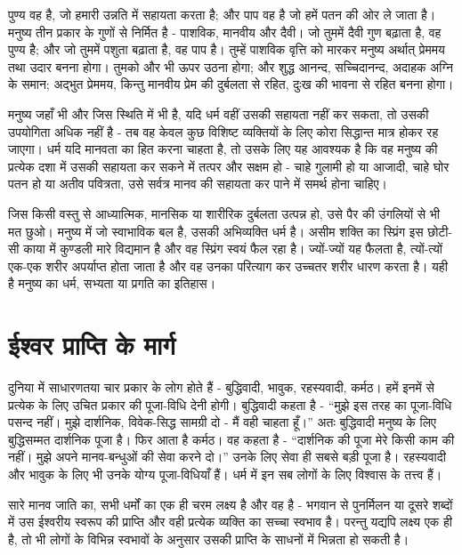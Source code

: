 पुण्य वह है, जो हमारी उन्नति में सहायता करता है; और पाप वह है जो हमें पतन की ओर ले जाता है। मनुष्य तीन प्रकार के गुणों से निर्मित है - पाशविक, मानवीय और दैवी। जो तुममें दैवी गुण बढ़ाता है, वह पुण्य है; और जो तुममें पशुता बढ़ाता है, वह पाप है। तुम्हें पाशविक वृत्ति को मारकर मनुष्य अर्थात् प्रेममय तथा उदार बनना होगा। तुमको और भी ऊपर उठना होगा; और शुद्ध आनन्द, सच्चिदानन्द, अदाहक अग्नि के समान; अद्भुत प्रेममय, किन्तु मानवीय प्रेम की दुर्बलता से रहित, दुःख की भावना से रहित बनना होगा। 

मनुष्य जहाँ भी और जिस स्थिति में भी है, यदि धर्म वहीं उसकी सहायता नहीं कर सकता, तो उसकी उपयोगिता अधिक नहीं है - तब वह केवल कुछ विशिष्ट व्यक्तियों के लिए कोरा सिद्धान्त मात्र होकर रह जाएगा। धर्म यदि मानवता का हित करना चाहता है, तो उसके लिए यह आवश्यक है कि वह मनुष्य की प्रत्येक दशा में उसकी सहायता कर सकने में तत्पर और सक्षम हो - चाहे गुलामी हो या आजादी, चाहे घोर पतन हो या अतीव पवित्रता, उसे सर्वत्र मानव की सहायता कर पाने में समर्थ होना चाहिए। 

जिस किसी वस्तु से आध्यात्मिक, मानसिक या शारीरिक दुर्बलता उत्पन्न हो, उसे पैर की उंगलियों से भी मत छुओ। मनुष्य में जो स्वाभाविक बल है, उसकी अभिव्यक्ति धर्म है। असीम शक्ति का स्प्रिंग इस छोटी-सी काया में कुण्डली मारे विद्यमान है और वह स्प्रिंग स्वयं फैल रहा है। ज्यों-ज्यों यह फैलता है, त्यों-त्यों एक-एक शरीर अपर्याप्त होता जाता है और वह उनका परित्याग कर उच्चतर शरीर धारण करता है। यही है मनुष्य का धर्म, सभ्यता या प्रगति का इतिहास।


\section*{ईश्वर प्राप्ति के मार्ग}


दुनिया में साधारणतया चार प्रकार के लोग होते हैं - बुद्धिवादी, भावुक, रहस्यवादी, कर्मठ। हमें इनमें से प्रत्येक के लिए उचित प्रकार की पूजा-विधि देनी होगी। बुद्धिवादी कहता है - “मुझे इस तरह का पूजा-विधि पसन्द नहीं। मुझे दार्शनिक, विवेक-सिद्ध सामग्री दो - मैं वही चाहता हूँ।” अतः बुद्धिवादी मनुष्य के लिए बुद्धिसम्मत दार्शनिक पूजा है। फिर आता है कर्मठ। वह कहता है - “दार्शनिक की पूजा मेरे किसी काम की नहीं। मुझे अपने मानव-बन्धुओं की सेवा करने दो।” उनके लिए सेवा ही सबसे बड़ी पूजा है। रहस्यवादी और भावुक के लिए भी उनके योग्य पूजा-विधियाँ हैं। धर्म में इन सब लोगों के लिए विश्वास के तत्त्व हैं। 

सारे मानव जाति का, सभी धर्मों का एक ही चरम लक्ष्य है और वह है - भगवान से पुनर्मिलन या दूसरे शब्दों में उस ईश्वरीय स्वरूप की प्राप्ति और वही प्रत्येक व्यक्ति का सच्चा स्वभाव है। परन्तु यद्यपि लक्ष्य एक ही है, तो भी लोगों के विभिन्न स्वभावों के अनुसार उसकी प्राप्ति के साधनों में भिन्नता हो सकती है। 

